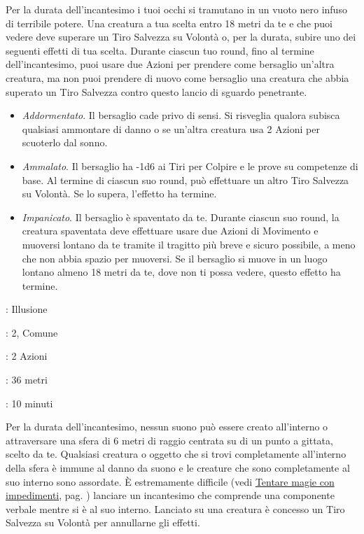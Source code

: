 \begin{multicols}{2}
Per la durata dell'incantesimo i tuoi occhi si tramutano in un vuoto nero infuso di terribile potere. Una creatura a tua scelta entro 18 metri da te e che puoi vedere deve superare un Tiro Salvezza su Volontà o, per la durata, subire uno dei seguenti effetti di tua scelta. Durante ciascun tuo round, fino al termine dell'incantesimo, puoi usare due Azioni per prendere come bersaglio un'altra creatura, ma non puoi prendere di nuovo come bersaglio una creatura che abbia superato un Tiro Salvezza contro questo lancio di sguardo penetrante.

\begin{itemize}[leftmargin=*] \setlength{\itemsep}{0pt}
	\item \emph{Addormentato}. Il bersaglio cade privo di sensi. Si risveglia qualora subisca qualsiasi ammontare di danno o se un'altra creatura usa 2 Azioni per scuoterlo dal sonno.
	\item \emph{Ammalato}. Il bersaglio ha -1d6 ai Tiri per Colpire e le prove su competenze di base. Al termine di ciascun suo round, può effettuare un altro Tiro Salvezza su Volontà. Se lo supera, l'effetto ha termine.
	\item \emph{Impanicato}. Il bersaglio è spaventato da te. Durante ciascun suo round, la creatura spaventata deve effettuare usare due Azioni di Movimento e muoversi lontano da te tramite il tragitto più breve e sicuro possibile, a meno che non abbia spazio per muoversi. Se il bersaglio si muove in un luogo lontano almeno 18 metri da te, dove non ti possa vedere, questo effetto ha termine.
\end{itemize}

\noindent\colorbox{OBSSgold!10}{
\begin{minipage}{0.95\linewidth}
\begin{description}[noitemsep, topsep=0pt, parsep=0pt, partopsep=0pt, leftmargin=0cm, labelwidth=1.3cm]
	\item[\textbf{Lista}]: Illusione
	\item[\textbf{Livello}]: 2, Comune
	\item[\textbf{Lancio}]: 2 Azioni
	\item[\textbf{Gittata}]: 36 metri
	\item[\textbf{Durata}]: 10 minuti
\end{description}
\end{minipage}}\smallskip

Per la durata dell'incantesimo, nessun suono può essere creato all'interno o attraversare una sfera di 6 metri di raggio centrata su di un punto a gittata, scelto da te. Qualsiasi creatura o oggetto che si trovi completamente all'interno della sfera è immune al danno da suono e le creature che sono completamente al suo interno sono assordate. È estremamente difficile (vedi \hyperlink{magieconimpedimenti}{Tentare magie con impedimenti}, pag. \pageref{magieconimpedimenti} ) lanciare un incantesimo che comprende una componente verbale mentre si è al suo interno. Lanciato su una creatura è concesso un Tiro Salvezza su Volontà per annullarne gli effetti.


\end{multicols}
